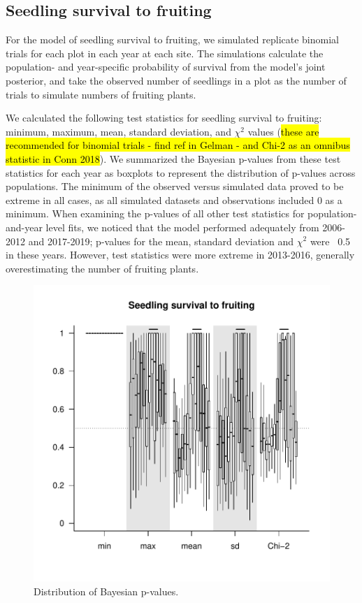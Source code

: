 \documentclass[12pt, oneside, titlepage]{article}   	%
\begin{document}
\subsection{Seedling survival to fruiting}

For the model of seedling survival to fruiting, we simulated replicate binomial trials for each plot in each year at each site. The simulations calculate the population- and year-specific probability of survival from the model's joint posterior, and take the observed number of seedlings in a plot as the number of trials to simulate numbers of fruiting plants. 

We calculated the following test statistics for seedling survival to fruiting: minimum, maximum, mean, standard deviation, and $\chi^2$ values (\hl{these are recommended for binomial trials - find ref in Gelman - and Chi-2 as an omnibus statistic in Conn 2018}). We summarized the Bayesian p-values from these test statistics for each year as boxplots to represent the distribution of p-values across populations. The minimum of the observed versus simulated data proved to be extreme in all cases, as all simulated datasets and observations included 0 as a minimum. When examining the p-values of all other test statistics for population-and-year level fits, we noticed that the model performed adequately from 2006-2012 and 2017-2019; p-values for the mean, standard deviation and $\chi^2$ were ~0.5 in these years. However, test statistics were more extreme in 2013-2016, generally overestimating the number of fruiting plants. 

\begin{figure}[!h]
   \centering
       \includegraphics[page=1,width=1\textwidth]{../../figures/modelChecks/seedlingSurvival-pvals.pdf}  
    \caption{ Distribution of Bayesian p-values.  }
 \label{fig:name}
\end{figure}
\end{document}
